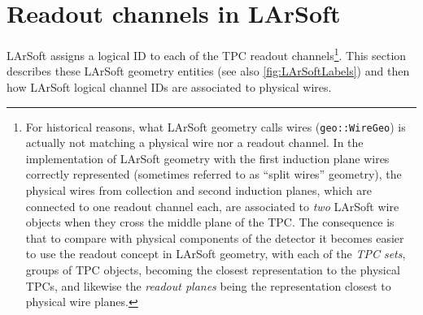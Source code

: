 \section{Readout channels in LArSoft}
\label{sec:LArSoft}


LArSoft assigns a logical ID to each of the TPC readout channels\footnote{
For historical reasons, what LArSoft geometry calls wires
(\texttt{geo::WireGeo}) is actually not matching a physical wire nor a readout
channel. In the implementation of LArSoft geometry with the first induction
plane wires correctly represented
(sometimes referred to as ``split wires'' geometry),
the physical wires from collection and
second induction planes, which are connected to one readout channel each,
are associated to \emph{two} LArSoft wire objects when they cross the middle
plane of the TPC.
The consequence is that to compare with physical components of the detector
it becomes easier to use the readout concept in LArSoft geometry,
with each of the \emph{TPC sets}, groups of TPC objects, becoming the closest
representation to the physical TPCs, and likewise the \emph{readout planes} being
the representation closest to physical wire planes.}.
This section describes these LArSoft geometry entities (see also \cref{fig:LArSoftLabels})
and then how LArSoft logical channel IDs are associated to physical wires.
